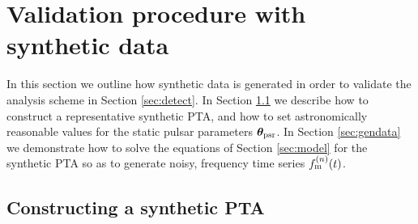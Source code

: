 \documentclass[fleqn,usenatbib,useAMS]{mnras}
\begin{document}
\section{Validation procedure with synthetic data} \label{sec:testing}
In this section we outline how synthetic data is generated in order to validate the analysis scheme in Section \ref{sec:detect}. In Section \ref{sec:synt_pta} we describe how to construct a representative synthetic PTA, and how to set astronomically reasonable values for the static pulsar parameters $\boldsymbol{\theta}_{\rm psr}$. In Section \ref{sec:gendata} we demonstrate how to solve the equations of Section \ref{sec:model} for the synthetic PTA so as to generate noisy, frequency time series $f_{\rm m}^{(n)}(t)$. 

\subsection{Constructing a synthetic PTA}\label{sec:synt_pta}
\end{document}
